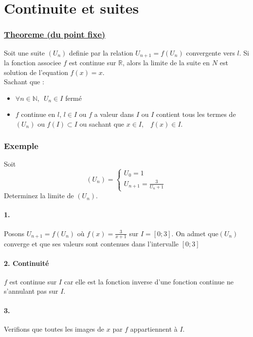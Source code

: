 \documentclass{article}
\begin{document}
\section{Continuite et suites}
\begin{defbox}
	\sloppy
	\subsubsection*{\underline{Theoreme (du point fixe)}}
	Soit une suite $(U_n)$ definie par la relation $U_{n+1} = f(U_n)$ convergente vers $l$. Si la fonction associee $f$ est continue sur $\mathbb{R}$, alors la limite de la suite en $N$ est solution de l'equation $f(x)=x$.\\
	\indent Sachant que :
	\begin{itemize}
		\item $\forall n \in \mathbb{N}$,\,\, $U_n \in I$ fermé
		\item $f$ continue en $l$,  $l\in I$ ou $f$ a valeur dans $I$ ou $I$ contient tous les termes de $(U_n)$ ou $f(I) \subset I$ ou sachant que $x\in I$, \,\, $f(x) \in I$.
	\end{itemize}
\end{defbox}
\subsubsection*{Exemple}
Soit 
$$ (U_n) = \begin{cases}
	U_0 = 1 \\
	U_{n+1} = \frac{3}{U_n+1}
\end{cases}
$$
Determinez la limite de $(U_n)$.

\paragraph{1.} Posons $U_{n+1} = f(U_n)$ où $f(x) = \frac{3}{x+1}$ sur $I=[0;3]$. On admet que$(U_n)$ converge et que ses valeurs sont contenues dans l'intervalle $[0;3]$
\paragraph{2. Continuité} $f$ est continue sur $I$ car elle est la fonction inverse d'une fonction continue ne s'annulant pas sur $I$.
\paragraph{3.} Verifions que toutes les images de $x$ par $f$ appartiennent à $I$.
\end{document}
